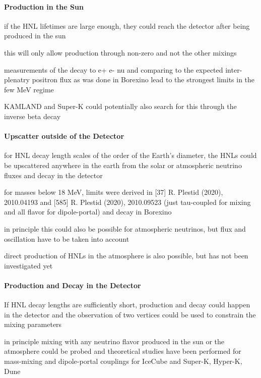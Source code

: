 \paragraph{Production in the Sun}

if the HNL lifetimes are large enough, they could reach the detector after being produced in the sun

this will only allow production through non-zero  and not the other mixings

measurements of the decay to e+ e- nu and comparing to the expected inter-plenatry positron flux as was done in Borexino lead to the strongest limits in the few MeV regime

KAMLAND and Super-K could potentially also search for this through the inverse beta decay


\paragraph{Upscatter outside of the Detector}

for HNL decay length scales of the order of the Earth's diameter, the HNLs could be upscattered anywhere in the earth from the solar or atmospheric neutrino fluxes and decay in the detector

for masses below 18 MeV, limits were derived in [37] R. Plestid (2020), 2010.04193 and [585] R. Plestid (2020), 2010.09523 (just tau-coupled for mixing and all flavor for dipole-portal) and decay in Borexino

in principle this could also be possible for atmospheric neutrinos, but flux and oscillation have to be taken into account

direct production of HNLs in the atmosphere is also possible, but has not been investigated yet

\paragraph{Production and Decay in the Detector}

If HNL decay lengths are sufficiently short, production and decay could happen in the detector and the observation of two vertices could be used to constrain the mixing parameters

in principle mixing with any neutrino flavor produced in the sun or the atmosphere could be probed and theoretical studies have been performed for mass-mixing and dipole-portal couplings for IceCube and Super-K, Hyper-K, Dune

